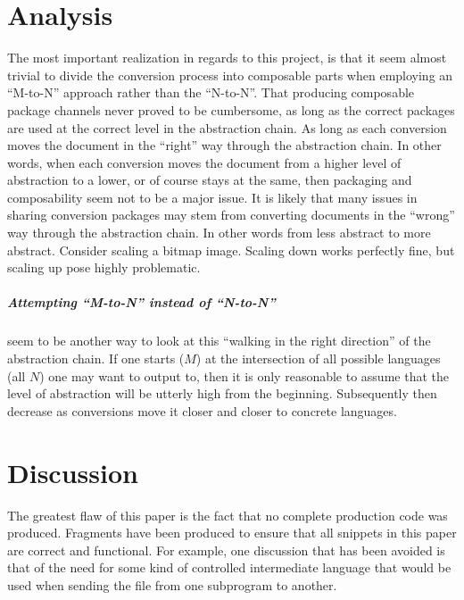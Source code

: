 \documentclass{scrreprt}
\begin{document}
\chapter{Analysis}
The most important realization in regards to this project, is that it seem almost trivial to divide the conversion process into composable parts when employing an ``M-to-N'' approach rather than the ``N-to-N''. That producing composable package channels never proved to be cumbersome, as long as the correct packages are used at the correct level in the abstraction chain. As long as each conversion moves the document in the ``right'' way through the abstraction chain. In other words, when each conversion moves the document from a higher level of abstraction to a lower, or of course stays at the same, then packaging and composability seem not to be a major issue. It is likely that many issues in sharing conversion packages may stem from converting documents in the ``wrong'' way through the abstraction chain. In other words from less abstract to more abstract. Consider scaling a bitmap image. Scaling down works perfectly fine, but scaling up pose highly problematic.
 
\paragraph{Attempting ``M-to-N'' instead of ``N-to-N''} seem to be another way to look at this ``walking in the right direction'' of the abstraction chain. If one starts ($M$) at the intersection of all possible languages (all $N$) one may want to output to, then it is only reasonable to assume that the level of abstraction will be utterly high from the beginning. Subsequently then decrease as conversions move it closer and closer to concrete languages.




















%
%
%
%
%
%


\chapter{Discussion}
The greatest flaw of this paper is the fact that no complete production code was produced. Fragments have been produced to ensure that all snippets in this paper are correct and functional. For example, one discussion that has been avoided is that of the need for some kind of controlled intermediate language that would be used when sending the file from one subprogram to another.
\end{document}
